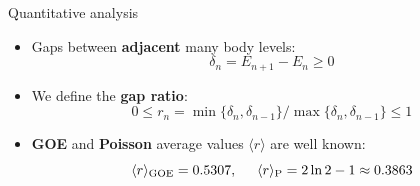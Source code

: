 \documentclass[1pt]{beamer}
\begin{document}
\begin{frame}{Quantitative analysis}
\begin{itemize}
	\item Gaps between \textbf{adjacent} many body levels:$$\delta_n=E_{n+1}-E_n \geq 0$$
	\item We define the \textbf{gap ratio}:\vspace{3mm}
	$$0\leq r_n=\min\{\delta_n, \delta_{n-1}\}/\max\{\delta_n, \delta_{n-1}\}\leq 1$$
	\item \textbf{GOE} and \textbf{Poisson} average values $\langle r \rangle$ are well known: \vspace{5mm} 
		$$ \langle r \rangle_\mathrm{GOE}=0.5307, \hspace{5mm} \langle r\rangle_\mathrm{P}=2\ln2 - 1 \approx 0.3863 $$
\end{itemize}
\end{frame}
\end{document}
